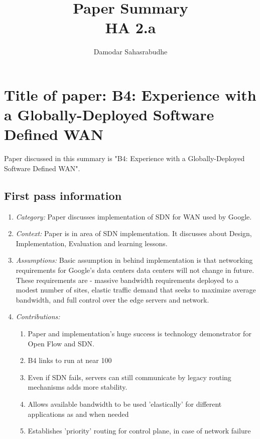 \documentclass[letterpaper,twocolumn,10pt]{article}
\title{Paper Summary\\
HA 2.a\\}
\author{Damodar Sahasrabudhe}
\affil{School of Computing, University of Utah}
\begin{document}
\maketitle
\section{Title of paper: B4: Experience with a Globally-Deployed Software Defined WAN}
Paper discussed in this summary is "B4: Experience with a Globally-Deployed Software Defined WAN"\cite{paper}.

\subsection{First pass information}
\label{sec:first}

\begin{enumerate}

\item {\it Category:} Paper discusses implementation of SDN for WAN used by Google.

\item {\it Context:} Paper is in area of SDN implementation. It discusses about Design, Implementation, Evaluation and learning lessons.

\item {\it Assumptions:}  
Basic assumption in behind implementation is that networking requirements for Google’s data centers data centers will not change in future. These requirements are - massive bandwidth requirements deployed to a modest number of sites, elastic traffic demand that seeks to maximize average bandwidth, and full control over the edge servers and network. 

\item {\it Contributions:} 
\begin{enumerate}
\item Paper and implementation's huge success is technology demonstrator for Open Flow and SDN.
\item B4 links to run at near 100%
\item Even if SDN fails, servers can still communicate by legacy routing mechanisms adds more stability.
\item Allows available bandwidth to be used 'elastically' for different applications as and when needed
\item Establishes 'priority' routing for control plane, in case of network failure
\end{enumerate}


\end{enumerate}
\end{document}
